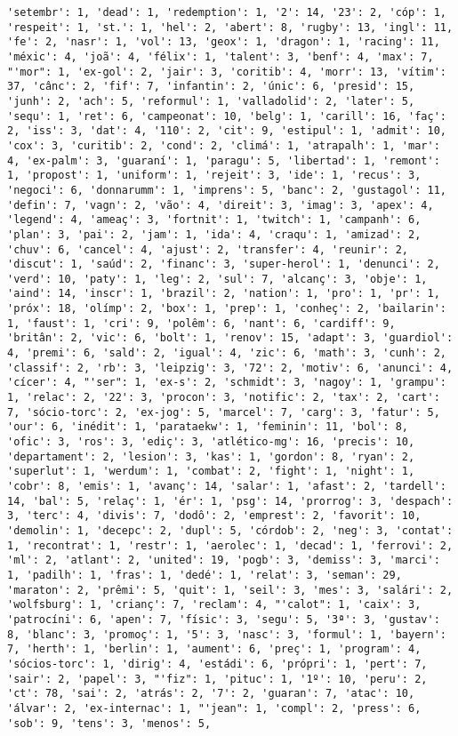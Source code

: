 \documentclass[11pt]{article}
\begin{document}
\begin{Verbatim}[commandchars=\\\{\}]
'setembr': 1, 'dead': 1, 'redemption': 1, '2': 14, '23': 2, 'cóp': 1, 'respeit': 1, 'st.': 1, 'hel': 2, 'abert': 8, 'rugby': 13, 'ingl': 11, 'fe': 2, 'nasr': 1, 'vol': 13, 'geox': 1, 'dragon': 1, 'racing': 11, 'méxic': 4, 'joã': 4, 'félix': 1, 'talent': 3, 'benf': 4, 'max': 7, "'mor": 1, 'ex-gol': 2, 'jair': 3, 'coritib': 4, 'morr': 13, 'vítim': 37, 'cânc': 2, 'fif': 7, 'infantin': 2, 'únic': 6, 'presid': 15, 'junh': 2, 'ach': 5, 'reformul': 1, 'valladolid': 2, 'later': 5, 'sequ': 1, 'ret': 6, 'campeonat': 10, 'belg': 1, 'carill': 16, 'faç': 2, 'iss': 3, 'dat': 4, '110': 2, 'cit': 9, 'estipul': 1, 'admit': 10, 'cox': 3, 'curitib': 2, 'cond': 2, 'climá': 1, 'atrapalh': 1, 'mar': 4, 'ex-palm': 3, 'guaraní': 1, 'paragu': 5, 'libertad': 1, 'remont': 1, 'propost': 1, 'uniform': 1, 'rejeit': 3, 'ide': 1, 'recus': 3, 'negoci': 6, 'donnarumm': 1, 'imprens': 5, 'banc': 2, 'gustagol': 11, 'defin': 7, 'vagn': 2, 'vão': 4, 'direit': 3, 'imag': 3, 'apex': 4, 'legend': 4, 'ameaç': 3, 'fortnit': 1, 'twitch': 1, 'campanh': 6, 'plan': 3, 'pai': 2, 'jam': 1, 'ida': 4, 'craqu': 1, 'amizad': 2, 'chuv': 6, 'cancel': 4, 'ajust': 2, 'transfer': 4, 'reunir': 2, 'discut': 1, 'saúd': 2, 'financ': 3, 'super-herol': 1, 'denunci': 2, 'verd': 10, 'paty': 1, 'leg': 2, 'sul': 7, 'alcanç': 3, 'obje': 1, 'aind': 14, 'inscr': 1, 'brazil': 2, 'nation': 1, 'pro': 1, 'pr': 1, 'próx': 18, 'olímp': 2, 'box': 1, 'prep': 1, 'conheç': 2, 'bailarin': 1, 'faust': 1, 'cri': 9, 'polêm': 6, 'nant': 6, 'cardiff': 9, 'britân': 2, 'vic': 6, 'bolt': 1, 'renov': 15, 'adapt': 3, 'guardiol': 4, 'premi': 6, 'sald': 2, 'igual': 4, 'zic': 6, 'math': 3, 'cunh': 2, 'classif': 2, 'rb': 3, 'leipzig': 3, '72': 2, 'motiv': 6, 'anunci': 4, 'cícer': 4, "'ser": 1, 'ex-s': 2, 'schmidt': 3, 'nagoy': 1, 'grampu': 1, 'relac': 2, '22': 3, 'procon': 3, 'notific': 2, 'tax': 2, 'cart': 7, 'sócio-torc': 2, 'ex-jog': 5, 'marcel': 7, 'carg': 3, 'fatur': 5, 'our': 6, 'inédit': 1, 'parataekw': 1, 'feminin': 11, 'bol': 8, 'ofic': 3, 'ros': 3, 'ediç': 3, 'atlético-mg': 16, 'precis': 10, 'departament': 2, 'lesion': 3, 'kas': 1, 'gordon': 8, 'ryan': 2, 'superlut': 1, 'werdum': 1, 'combat': 2, 'fight': 1, 'night': 1, 'cobr': 8, 'emis': 1, 'avanç': 14, 'salar': 1, 'afast': 2, 'tardell': 14, 'bal': 5, 'relaç': 1, 'ér': 1, 'psg': 14, 'prorrog': 3, 'despach': 3, 'terc': 4, 'divis': 7, 'dodô': 2, 'emprest': 2, 'favorit': 10, 'demolin': 1, 'decepc': 2, 'dupl': 5, 'córdob': 2, 'neg': 3, 'contat': 1, 'recontrat': 1, 'restr': 1, 'aerolec': 1, 'decad': 1, 'ferrovi': 2, 'ml': 2, 'atlant': 2, 'united': 19, 'pogb': 3, 'demiss': 3, 'marci': 1, 'padilh': 1, 'fras': 1, 'dedé': 1, 'relat': 3, 'seman': 29, 'maraton': 2, 'prêmi': 5, 'quit': 1, 'seil': 3, 'mes': 3, 'salári': 2, 'wolfsburg': 1, 'crianç': 7, 'reclam': 4, "'calot": 1, 'caix': 3, 'patrocíni': 6, 'apen': 7, 'físic': 3, 'segu': 5, '3ª': 3, 'gustav': 8, 'blanc': 3, 'promoç': 1, '5': 3, 'nasc': 3, 'formul': 1, 'bayern': 7, 'herth': 1, 'berlin': 1, 'aument': 6, 'preç': 1, 'program': 4, 'sócios-torc': 1, 'dirig': 4, 'estádi': 6, 'própri': 1, 'pert': 7, 'sair': 2, 'papel': 3, "'fiz": 1, 'pituc': 1, '1º': 10, 'peru': 2, 'ct': 78, 'sai': 2, 'atrás': 2, '7': 2, 'guaran': 7, 'atac': 10, 'álvar': 2, 'ex-internac': 1, "'jean": 1, 'compl': 2, 'press': 6, 'sob': 9, 'tens': 3, 'menos': 5, 
\end{Verbatim}
\end{document}
